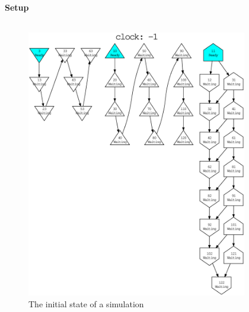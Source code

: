 \begin{frame}[fragile]%
    \frametitle{\EvaluationTitle}
    \framesubtitle{Setup}
    \begin{columns}%
        \begin{column}{0.50\textwidth}
            \begin{figure}
            \centering
                \includegraphics[scale=0.21]{evaluation/dot_files/example_graph_initial_compact.eps}
                \caption{The initial state of a simulation}
            \end{figure}
        \end{column}%
        \begin{column}{0.50\textwidth}
            \begin{figure}
                \centering

\end{figure}
\end{column}
\end{columns}
\end{frame}
